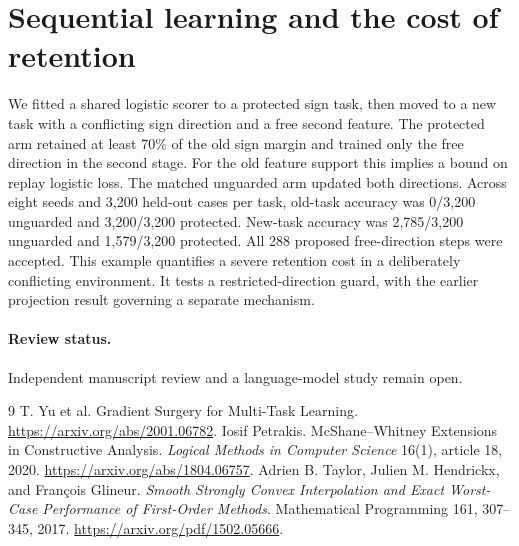 \documentclass[11pt]{article}
\begin{document}
\section{Sequential learning and the cost of retention}
We fitted a shared logistic scorer to a protected sign task,
then moved to a new task with a conflicting sign direction and a
free second feature. The protected arm retained at least 70\%
of the old sign margin and trained only the free direction in the
second stage. For the old feature support this implies a bound
on replay logistic loss. The matched unguarded arm updated both
directions. Across eight seeds and 3,200 held-out cases per task,
old-task accuracy was 0/3,200 unguarded and 3,200/3,200 protected.
New-task accuracy was 2,785/3,200 unguarded and 1,579/3,200
protected. All 288 proposed free-direction steps were accepted.
This example quantifies a severe retention cost in a deliberately
conflicting environment. It tests a restricted-direction guard,
with the earlier projection result governing a separate mechanism.

\paragraph{Review status.} Independent manuscript review and a language-model study remain open.

\begin{thebibliography}{9}
 T. Yu et al. Gradient Surgery for Multi-Task Learning.
\url{https://arxiv.org/abs/2001.06782}.
 Iosif Petrakis. McShane--Whitney
Extensions in Constructive Analysis. \emph{Logical Methods
in Computer Science} 16(1), article 18, 2020.
\url{https://arxiv.org/abs/1804.06757}.
 Adrien B. Taylor, Julien M. Hendrickx, and
Fran\c{c}ois Glineur. \emph{Smooth Strongly Convex Interpolation
and Exact Worst-Case Performance of First-Order Methods}.
Mathematical Programming 161, 307--345, 2017.
\url{https://arxiv.org/pdf/1502.05666}.
\end{thebibliography}
\end{document}
